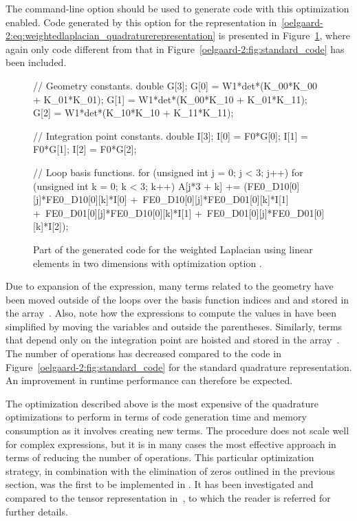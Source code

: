 The \ffc{} command-line option 
should be used to generate code with this optimization
enabled.  Code generated by this option for the representation
in~\eqref{oelgaard-2:eq:weightedlaplacian_quadraturerepresentation}
is presented in Figure~\ref{oelgaard-2:fig:O_simplify_code}, where again
only code different from that in Figure~\ref{oelgaard-2:fig:standard_code}
has been included.
%
\begin{figure}
\begin{c++}
// Geometry constants.
double G[3];
G[0] = W1*det*(K_00*K_00 + K_01*K_01);
G[1] = W1*det*(K_00*K_10 + K_01*K_11);
G[2] = W1*det*(K_10*K_10 + K_11*K_11);

// Integration point constants.
double I[3];
I[0] = F0*G[0];
I[1] = F0*G[1];
I[2] = F0*G[2];

// Loop basis functions.
for (unsigned int j = 0; j < 3; j++)
{
 for (unsigned int k = 0; k < 3; k++)
 {
  A[j*3 + k] += (FE0_D10[0][j]*FE0_D10[0][k]*I[0] +\
                 FE0_D10[0][j]*FE0_D01[0][k]*I[1] +\
                 FE0_D01[0][j]*FE0_D10[0][k]*I[1] +\
                 FE0_D01[0][j]*FE0_D01[0][k]*I[2]);
 }
}
\end{c++}
\caption{Part of the generated code for the weighted Laplacian using
         linear elements in two dimensions with optimization option
         .}
\label{oelgaard-2:fig:O_simplify_code}
\end{figure}
%
Due to expansion of the expression, many terms related to the geometry
have been moved outside of the loops over the basis function indices
 and  and stored in the array~.  Also, note how
the expressions to compute the values in \emp{G} have been simplified
by moving the variables \emp{det} and \emp{W1} outside the parentheses.
Similarly, terms that depend only on the integration point are hoisted
and stored in the array~\emp{I}.  The number of operations has decreased
compared to the code in Figure~\ref{oelgaard-2:fig:standard_code}
for the standard quadrature representation. An improvement in runtime
performance can therefore be expected.

The optimization described above is the most expensive of the quadrature
optimizations to perform in terms of \ffc{} code generation time and
memory consumption as it involves creating new terms.  The procedure
does not scale well for complex expressions, but it is in many cases the
most effective approach in terms of reducing the number of operations.
This particular optimization strategy, in combination with the
elimination of zeros outlined in the previous section, was the first to
be implemented in \ffc{}.  It has been investigated and compared to the
tensor representation in~\citet{OelgaardWells2010}, to which the reader
is referred for further details.
